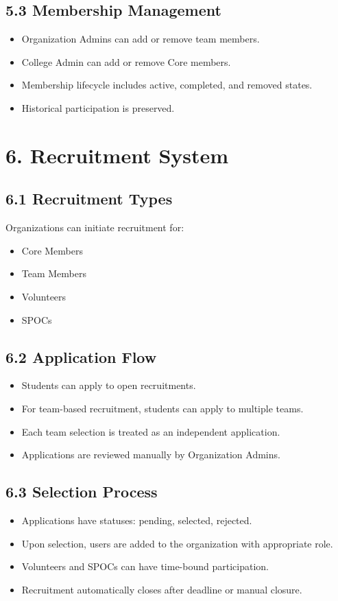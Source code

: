 \documentclass[12pt]{article}
\begin{document}
\subsection*{5.3 Membership Management}
\begin{itemize}
    \item Organization Admins can add or remove team members.
    \item College Admin can add or remove Core members.
    \item Membership lifecycle includes active, completed, and removed states.
    \item Historical participation is preserved.
\end{itemize}

\section*{6. Recruitment System}

\subsection*{6.1 Recruitment Types}
Organizations can initiate recruitment for:
\begin{itemize}
    \item Core Members
    \item Team Members
    \item Volunteers
    \item SPOCs
\end{itemize}

\subsection*{6.2 Application Flow}
\begin{itemize}
    \item Students can apply to open recruitments.
    \item For team-based recruitment, students can apply to multiple teams.
    \item Each team selection is treated as an independent application.
    \item Applications are reviewed manually by Organization Admins.
\end{itemize}

\subsection*{6.3 Selection Process}
\begin{itemize}
    \item Applications have statuses: pending, selected, rejected.
    \item Upon selection, users are added to the organization with appropriate role.
    \item Volunteers and SPOCs can have time-bound participation.
    \item Recruitment automatically closes after deadline or manual closure.
\end{itemize}
\end{document}
